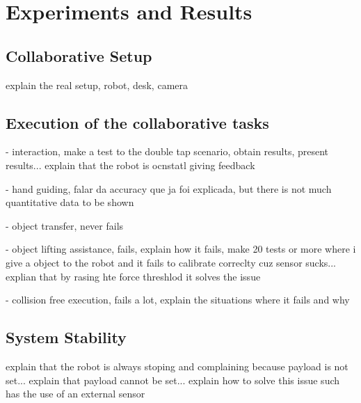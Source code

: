 \chapter{Experiments and Results}

\section{Collaborative Setup}

\par explain the real setup, robot, desk, camera

\section{Execution of the collaborative tasks}

\par - interaction, make a test to the double tap scenario, obtain results, present results... explain that the robot is ocnstatl giving feedback

\par  - hand guiding, falar da accuracy que ja foi explicada, but there is not much quantitative data to be shown

\par - object transfer, never fails

\par - object lifting assistance, fails, explain how it fails, make 20 tests or more where i give a object to the robot and it fails to calibrate correclty cuz sensor sucks... explian that by rasing hte force threshlod it solves the issue

\par - collision free execution, fails a lot, explain the situations where it fails and why

\section{System Stability}

\par explain that the robot is always stoping and complaining because payload is not set... explain that payload cannot be set... explain how to solve this issue such has the use of an external sensor